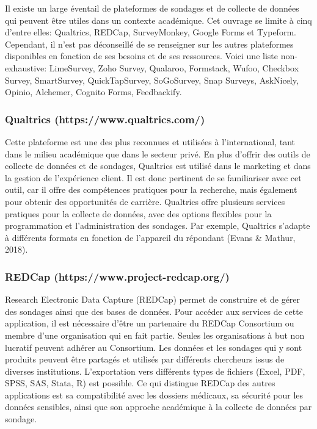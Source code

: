 \documentclass[
  letterpaper,
]{scrbook}
\begin{document}
\hfill\break
Il existe un large éventail de plateformes de sondages et de collecte de
données qui peuvent être utiles dans un contexte académique. Cet ouvrage
se limite à cinq d'entre elles: Qualtrics, REDCap, SurveyMonkey, Google
Forms et Typeform. Cependant, il n'est pas déconseillé de se renseigner
sur les autres plateformes disponibles en fonction de ses besoins et de
ses ressources. Voici une liste non-exhaustive: LimeSurvey, Zoho Survey,
Qualaroo, Formstack, Wufoo, Checkbox Survey, SmartSurvey,
QuickTapSurvey, SoGoSurvey, Snap Surveys, AskNicely, Opinio, Alchemer,
Cognito Forms, Feedbackify.

\hypertarget{qualtrics-httpswww.qualtrics.com}{%
\subsubsection{Qualtrics
(https://www.qualtrics.com/)}\label{qualtrics-httpswww.qualtrics.com}}

\hfill\break
Cette plateforme est une des plus reconnues et utilisées à
l'international, tant dans le milieu académique que dans le secteur
privé. En plus d'offrir des outils de collecte de données et de
sondages, Qualtrics est utilisé dans le marketing et dans la gestion de
l'expérience client. Il est donc pertinent de se familiariser avec cet
outil, car il offre des compétences pratiques pour la recherche, mais
également pour obtenir des opportunités de carrière. Qualtrics offre
plusieurs services pratiques pour la collecte de données, avec des
options flexibles pour la programmation et l'administration des
sondages. Par exemple, Qualtrics s'adapte à différents formats en
fonction de l'appareil du répondant (Evans \& Mathur, 2018).

\hypertarget{redcap-httpswww.project-redcap.org}{%
\subsubsection{REDCap
(https://www.project-redcap.org/)}\label{redcap-httpswww.project-redcap.org}}

\hfill\break
Research Electronic Data Capture (REDCap) permet de construire et de
gérer des sondages ainsi que des bases de données. Pour accéder aux
services de cette application, il est nécessaire d'être un partenaire du
REDCap Consortium ou membre d'une organisation qui en fait partie.
Seules les organisations à but non lucratif peuvent adhérer au
Consortium. Les données et les sondages qui y sont produits peuvent être
partagés et utilisés par différents chercheurs issus de diverses
institutions. L'exportation vers différents types de fichiers (Excel,
PDF, SPSS, SAS, Stata, R) est possible. Ce qui distingue REDCap des
autres applications est sa compatibilité avec les dossiers médicaux, sa
sécurité pour les données sensibles, ainsi que son approche académique à
la collecte de données par sondage.
\end{document}
